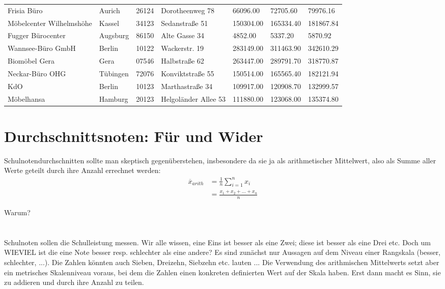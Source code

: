 {\begin{longtable}{lllllll}
        Frisia Büro & Aurich & 26124 & Dorotheenweg 78 & 66096.00 & 72705.60 & 79976.16 \\
        Möbelcenter Wilhelmshöhe & Kassel & 34123 & Sedanstraße 51 & 150304.00 & 165334.40 & 181867.84 \\
        Fugger Bürocenter & Augsburg & 86150 & Alte Gasse 34 & 4852.00 & 5337.20 & 5870.92 \\
        Wannsee-Büro GmbH & Berlin & 10122 & Wackerstr. 19 & 283149.00 & 311463.90 & 342610.29 \\
        Biomöbel Gera & Gera & 07546 & Halbstraße 62 & 263447.00 & 289791.70 & 318770.87 \\
        Neckar-Büro OHG & Tübingen & 72076 & Konviktstraße 55 & 150514.00 & 165565.40 & 182121.94 \\
        KdO & Berlin & 10123 & Marthastraße 34 & 109917.00 & 120908.70 & 132999.57 \\
        Möbelhansa & Hamburg & 20123 & Helgoländer Allee 53 & 111880.00 & 123068.00 & 135374.80 \\
\end{longtable}}

\section{Durchschnittsnoten: Für und Wider}

Schulnotendurchschnitten sollte man skeptisch gegenüberstehen, insbesondere da sie ja als arithmetischer Mittelwert, also als Summe aller Werte geteilt durch ihre Anzahl errechnet werden: \\

\begin{equation}
    \begin{aligned}
        \overline{x}_{arith} &= \frac{1}{n}\sum_{i=1}^{n}x_i \\
                             &= \frac{x_1+x_2+\dots+x_n}{n}
    \end{aligned}
  \end{equation}

Warum? \\ \\ \\
Schulnoten sollen die Schulleistung messen. Wir alle wissen, eine \glqq Eins\grqq\: ist besser als eine  \glqq Zwei\grqq; diese ist besser als eine  \glqq Drei\grqq\: etc.
Doch um WIEVIEL ist die eine Note besser resp. schlechter als eine andere? Es sind zunächst nur Aussagen auf dem Niveau einer Rangskala (besser, schlechter, ...). Die Zahlen könnten auch  \glqq Sieben\grqq,  \glqq Dreizehn\grqq,  \glqq Siebzehn\grqq\: etc. lauten ...
Die Verwendung des arithmischen Mittelwerts setzt aber ein metrisches Skalenniveau voraus, bei dem die Zahlen einen konkreten definierten Wert auf der Skala haben. Erst dann macht es Sinn, sie zu addieren und durch ihre Anzahl zu teilen.

